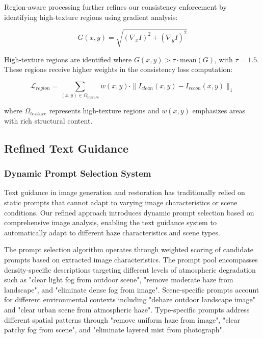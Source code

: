\documentclass{article}
\begin{document}
Region-aware processing further refines our consistency enforcement by identifying high-texture regions using gradient analysis:

\begin{equation}
G(x,y) = \sqrt{(\nabla_x I)^2 + (\nabla_y I)^2}
\end{equation}

High-texture regions are identified where $G(x,y) > \tau \cdot \text{mean}(G)$, with $\tau = 1.5$. These regions receive higher weights in the consistency loss computation:

\begin{equation}
\mathcal{L}_{region} = \sum_{(x,y) \in \Omega_{texture}} w(x,y) \cdot \|I_{clean}(x,y) - I_{recon}(x,y)\|_1
\end{equation}

where $\Omega_{texture}$ represents high-texture regions and $w(x,y)$ emphasizes areas with rich structural content.

\subsection{Refined Text Guidance}

\subsubsection{Dynamic Prompt Selection System}

Text guidance in image generation and restoration has traditionally relied on static prompts that cannot adapt to varying image characteristics or scene conditions. Our refined approach introduces dynamic prompt selection based on comprehensive image analysis, enabling the text guidance system to automatically adapt to different haze characteristics and scene types.

The prompt selection algorithm operates through weighted scoring of candidate prompts based on extracted image characteristics. The prompt pool encompasses density-specific descriptions targeting different levels of atmospheric degradation such as "clear light fog from outdoor scene", "remove moderate haze from landscape", and "eliminate dense fog from image". Scene-specific prompts account for different environmental contexts including "dehaze outdoor landscape image" and "clear urban scene from atmospheric haze". Type-specific prompts address different spatial patterns through "remove uniform haze from image", "clear patchy fog from scene", and "eliminate layered mist from photograph".
\end{document}
